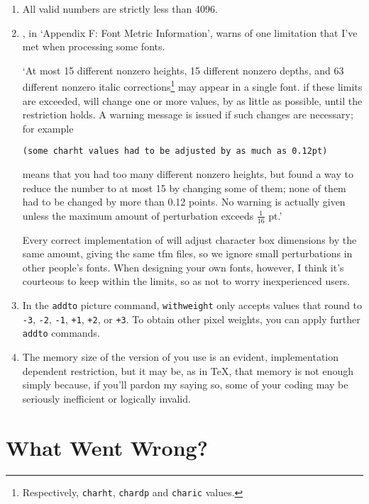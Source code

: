 \begin{enumerate}
\item
All valid numbers are strictly less than 4096.

\item
\MFbook{}, in `Appendix F: Font Metric Information',
warns of one limitation that I've met when processing some fonts.

`At most 15 different nonzero heights, 15 different nonzero depths,
and 63 different nonzero italic corrections\footnote{Respectively,
{\tt charht}, {\tt chardp} and {\tt charic} values.}
may appear in a single font.  if these limits are exceeded,
\MF{} will change one or more values, by as little as possible,
until the restriction holds.  A warning message is issued if such
changes are necessary; for example

{\small\tt (some charht values had to be adjusted by as much as 0.12pt)}

means that you had too many different nonzero heights, but \MF{}
found a way to reduce the number to at most 15 by changing some of them;
none of them had to be changed by more than 0.12 points.
No warning is actually given unless the maximum amount of perturbation
exceeds $\frac{1}{16}$ pt.'

Every correct implementation of \MF{} will adjust character box
dimensions by the same amount, giving the same {\sc tfm} files, so we
ignore small perturbations in other people's fonts.  When designing
your own fonts, however, I think it's courteous to keep within the
limits, so as not to worry inexperienced users.

\item
In the {\tt addto} picture command, {\tt withweight} only accepts
values that round to {\tt -3}, {\tt -2}, {\tt -1}, {\tt +1}, {\tt +2},
or {\tt +3}.  To obtain other pixel weights, you can apply further
{\tt addto} commands.

\item
The memory size of the version of \MF{} you use is an evident,
implementation dependent restriction, but it may be, as in \TeX{},
that memory is not enough simply because, if you'll pardon my saying
so, some of your coding may be seriously inefficient or logically
invalid.
\end{enumerate}


\section{What Went Wrong?}

